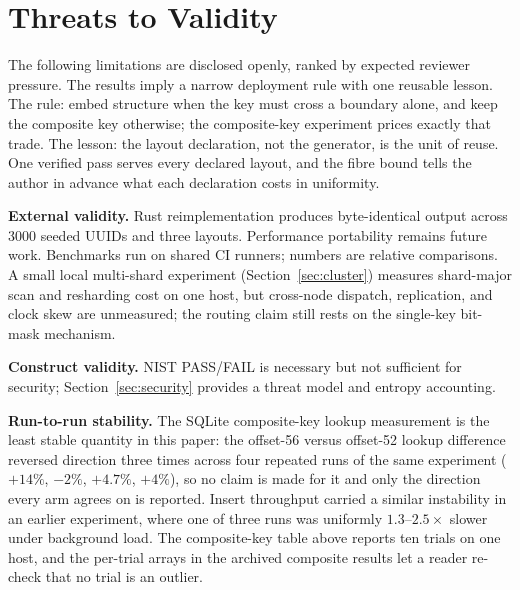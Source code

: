 \documentclass{svproc}
\begin{document}
\section{Threats to Validity}
\label{sec:validity}
The following limitations are disclosed openly, ranked by expected reviewer pressure. The results imply a narrow deployment rule with one reusable lesson. The rule: embed structure when the key must cross a boundary alone, and keep the composite key otherwise; the composite-key experiment prices exactly that trade. The lesson: the layout declaration, not the generator, is the unit of reuse. One verified pass serves every declared layout, and the fibre bound tells the author in advance what each declaration costs in uniformity.

\textbf{External validity.} Rust reimplementation produces byte-identical output across 3000 seeded UUIDs and three layouts. Performance portability remains future work. Benchmarks run on shared CI runners; numbers are relative comparisons. A small local multi-shard experiment (Section~\ref{sec:cluster}) measures shard-major scan and resharding cost on one host, but cross-node dispatch, replication, and clock skew are unmeasured; the routing claim still rests on the single-key bit-mask mechanism.

\textbf{Construct validity.} NIST PASS/FAIL is necessary but not sufficient for security; Section~\ref{sec:security} provides a threat model and entropy accounting.

\textbf{Run-to-run stability.} The SQLite composite-key lookup measurement is the least stable quantity in this paper: the offset-56 versus offset-52 lookup difference reversed direction three times across four repeated runs of the same experiment ($+14\%$, $-2\%$, $+4.7\%$, $+4\%$), so no claim is made for it and only the direction every arm agrees on is reported. Insert throughput carried a similar instability in an earlier experiment, where one of three runs was uniformly $1.3$--$2.5\times$ slower under background load. The composite-key table above reports ten trials on one host, and the per-trial arrays in the archived composite results let a reader re-check that no trial is an outlier.
\end{document}
